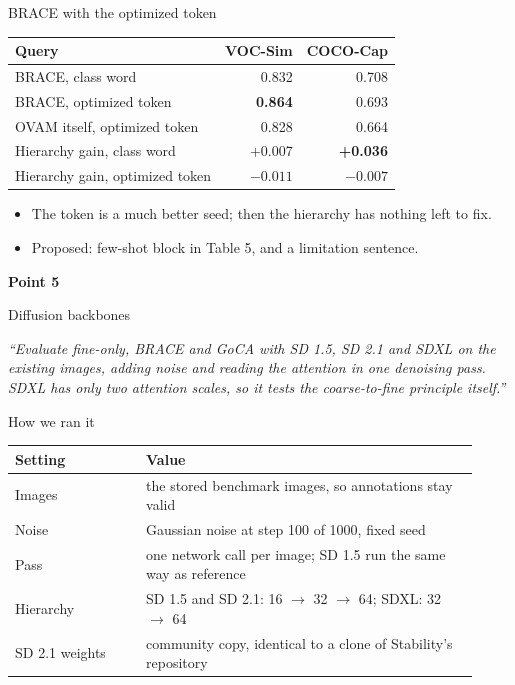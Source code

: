 \documentclass[aspectratio=169,11pt]{beamer}
\newcommand{\pointcover}[3]{%
\begin{frame}[plain]
\vfill
\begin{center}
{\LARGE\bfseries Point #1}\par\vspace{0.6em}
{\Large #2}\par\vspace{1.4em}
\begin{minipage}{0.78\linewidth}\centering\itshape #3\end{minipage}
\end{center}
\vfill
\end{frame}}
\begin{document}
\begin{frame}{BRACE with the optimized token}
\begin{slidetable}
\begin{tabular}{@{}lrr@{}}
\toprule
Query & VOC-Sim & COCO-Cap \\
\midrule
BRACE, class word & 0.832 & 0.708 \\
BRACE, optimized token & \textbf{0.864} & 0.693 \\
OVAM itself, optimized token & 0.828 & 0.664 \\
\midrule
Hierarchy gain, class word & +0.007 & \textbf{+0.036} \\
Hierarchy gain, optimized token & $-0.011$ & $-0.007$ \\
\bottomrule
\end{tabular}
\end{slidetable}
\begin{itemize}
\item The token is a much better seed; then the hierarchy has nothing left to fix.
\item Proposed: few-shot block in Table 5, and a limitation sentence.
\end{itemize}
\end{frame}

\pointcover{5}{Diffusion backbones}{``Evaluate fine-only, BRACE and GoCA with SD 1.5, SD 2.1 and SDXL on the existing images, adding noise and reading the attention in one denoising pass. SDXL has only two attention scales, so it tests the coarse-to-fine principle itself.''}

\begin{frame}{How we ran it}
\begin{slidetable}
\begin{tabular}{@{}L{0.26\linewidth}L{0.66\linewidth}@{}}
\toprule
Setting & Value \\
\midrule
Images & the stored benchmark images, so annotations stay valid \\
Noise & Gaussian noise at step 100 of 1000, fixed seed \\
Pass & one network call per image; SD 1.5 run the same way as reference \\
Hierarchy & SD 1.5 and SD 2.1: 16 $\rightarrow$ 32 $\rightarrow$ 64; SDXL: 32 $\rightarrow$ 64 \\
SD 2.1 weights & community copy, identical to a clone of Stability's repository \\
\bottomrule
\end{tabular}
\end{slidetable}
\end{frame}
\end{document}
